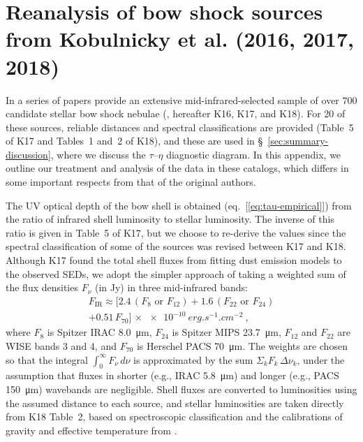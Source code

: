 \section{Reanalysis of bow shock sources from Kobulnicky et al. (2016,
  2017, 2018)}
\label{app:bow-shock-data}

In a series of papers \citeauthor{Kobulnicky:2018a} provide an
extensive mid-infrared-selected sample of over 700 candidate stellar
bow shock nebulae (\citealp{Kobulnicky:2016a, Kobulnicky:2017a,
  Kobulnicky:2018a}, hereafter K16, K17, and K18).  For 20 of these
sources, reliable distances and spectral classifications are provided
(Table~5 of K17 and Tables~1 and~2 of K18), and these are used in
\S~\ref{sec:summary-discussion}, where we discuss the
\(\tau\)--\(\eta\) diagnostic diagram.  In this appendix, we outline our
treatment and analysis of the data in these catalogs, which differs in
some important respects from that of the original authors.

The UV optical depth of the bow shell is obtained
(eq.~[\ref{eq:tau-empirical}]) from the ratio of infrared shell
luminosity to stellar luminosity.  The inverse of this ratio is given
in Table~5 of K17, but we choose to re-derive the values since the
spectral classification of some of the sources was revised between K17
and K18.  Although K17 found the total shell fluxes from fitting dust
emission models to the observed SEDs, we adopt the simpler approach of
taking a weighted sum of the flux densities \(F_\nu\) (in \si{Jy}) in
three mid-infrared bands:
\begin{multline}
  \label{eq:total-ir-flux}
  F_{\text{IR}}  \approx \bigl[  2.4\,(F_8 \text{ or } F_{12})
    + 1.6\,(F_{22} \text{ or } F_{24})  \\
  + 0.51\,F_{70}\bigr]
  \,\times \SI{e-10}{erg.s^{-1}.cm^{-2}} \ ,
\end{multline}
where \(F_8\) is Spitzer IRAC \SI{8.0}{\um}, \(F_{24}\) is Spitzer
MIPS \SI{23.7}{\um}, \(F_{12}\) and \(F_{22}\) are WISE bands 3 and 4,
and \(F_{70}\) is Herschel PACS \SI{70}{\um}.  The weights are chosen
so that the integral \(\int_0^\infty F_\nu \,d\nu\) is approximated by the sum
\(\Sigma_k F_k\, \Delta\nu_k\), under the assumption that fluxes in shorter (e.g.,
IRAC \SI{5.8}{\um}) and longer (e.g., PACS \SI{150}{\um}) wavebands
are negligible.  Shell fluxes are converted to luminosities using the
assumed distance to each source, and stellar luminosities are taken
directly from K18 Table~2, based on spectroscopic classification and
the calibrations of gravity and effective temperature from
\citet{Martins:2005a}.  

